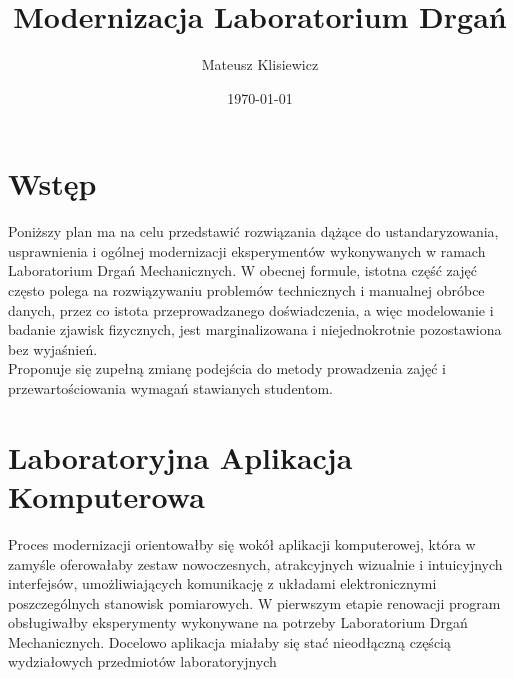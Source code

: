 \documentclass[12pt]{article}
\title{Modernizacja Laboratorium Drgań}
\author{Mateusz Klisiewicz}
\date{\today}
\title{\mytitle \\
  \large \mysubtitle}
\begin{document}
\maketitle
\newpage
\section*{Wstęp}
Poniższy plan ma na celu przedstawić rozwiązania dążące do ustandaryzowania, usprawnienia i ogólnej modernizacji eksperymentów wykonywanych w ramach Laboratorium Drgań Mechanicznych. W obecnej formule, istotna część zajęć często polega na rozwiązywaniu problemów technicznych i manualnej obróbce danych, przez co istota przeprowadzanego doświadczenia, a więc modelowanie i badanie zjawisk fizycznych, jest marginalizowana i niejednokrotnie pozostawiona bez wyjaśnień. \\Proponuje się zupełną zmianę podejścia do metody prowadzenia zajęć i przewartościowania wymagań stawianych studentom.
\section*{Laboratoryjna Aplikacja Komputerowa}
Proces modernizacji orientowałby się wokół aplikacji komputerowej, która w zamyśle oferowałaby zestaw nowoczesnych, atrakcyjnych wizualnie i intuicyjnych interfejsów, umożliwiających komunikację z układami elektronicznymi poszczególnych stanowisk pomiarowych. W pierwszym etapie renowacji program obsługiwałby eksperymenty wykonywane na potrzeby Laboratorium Drgań Mechanicznych. Docelowo aplikacja miałaby się stać nieodłączną częścią wydziałowych przedmiotów laboratoryjnych
\end{document}
